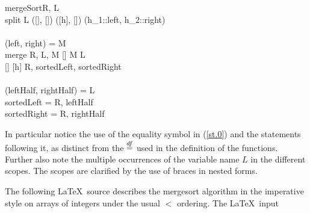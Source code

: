 \documentclass[a4]{article}
\begin{document}
\begin{pseudocode}{mergeSort}{R, L}
\label{mergeSort}
\BEGIN
  \\
  \LET 
   \REC \FUN
   {split} {L}
   \BEGIN
     \CASES
      {([], [])} 
      {([h], [])} 
      {(h_1::left, h_2::right)} 
     \ENDCASES\\
     \WHERE\\
     (left, right) =  {M}
   \END
   \ENDFUN\\
  \REC \FUN 
  {merge} {R, L, M}
    \BEGIN
      \CASES
       {[]} 
       {M}  
       {L}  
      \ENDCASES
    \END
    \ENDFUN\\
\IN 
  \BEGIN
    \CASES
     {[]} 
     {[h]} 
     { {R, sortedLeft, sortedRight}}
    \ENDCASES
  \END\\
  \WHERE\\
  (leftHalf, rightHalf) =  {L} \\
  sortedLeft =  {R, leftHalf}\\
  sortedRight =  {R, rightHalf}\\
\END
\end{pseudocode}


In particular notice the use of the equality symbol in (\ref{st.0})
and the statements following it, as distinct from the $\stackrel{df}{=}$ used in the
definition of the functions. Further also note the multiple occurrences of the variable name $L$ in the different scopes. The scopes are clarified by the use of braces in nested forms. 

\noindent{}The following \LaTeX\ source describes the mergesort
algorithm in the imperative style on arrays of integers
under the usual $<$ ordering. The \LaTeX\ input
\end{document}
